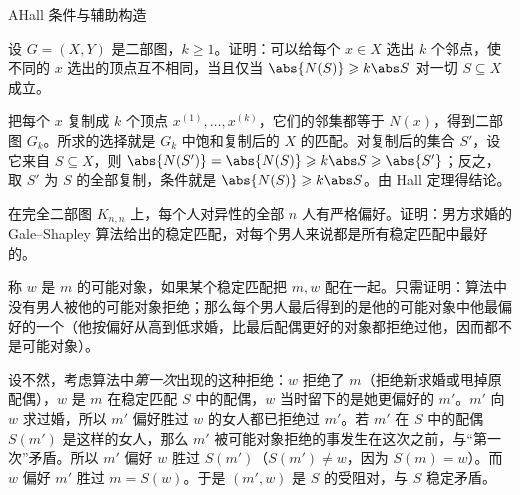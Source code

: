 \begin{exercises}{A}{Hall 条件与辅助构造}
\item\label{ex:hall-condition:A4} 设 $G=(X,Y)$ 是二部图，$k\geqslant1$。证明：可以给每个 $x\in X$ 选出 $k$ 个邻点，使不同的 $x$ 选出的顶点互不相同，当且仅当 $\abs{N(S)}\geqslant k\abs S$ 对一切 $S\subseteq X$ 成立。
\begin{solution}
把每个 $x$ 复制成 $k$ 个顶点 $x^{(1)},\dots,x^{(k)}$，它们的邻集都等于 $N(x)$，得到二部图 $G_k$。所求的选择就是 $G_k$ 中饱和复制后的 $X$ 的匹配。对复制后的集合 $S'$，设它来自 $S\subseteq X$，则 $\abs{N(S')}=\abs{N(S)}\geqslant k\abs S\geqslant\abs{S'}$；反之，取 $S'$ 为 $S$ 的全部复制，条件就是 $\abs{N(S)}\geqslant k\abs S$。由 Hall 定理得结论。
\end{solution}

\item\label{ex:hall-condition:A5} 在完全二部图 $K_{n,n}$ 上，每个人对异性的全部 $n$ 人有严格偏好。证明：男方求婚的 Gale--Shapley 算法给出的稳定匹配，对每个男人来说都是所有稳定匹配中最好的。
\begin{solution}
称 $w$ 是 $m$ 的可能对象，如果某个稳定匹配把 $m,w$ 配在一起。只需证明：算法中没有男人被他的可能对象拒绝；那么每个男人最后得到的是他的可能对象中他最偏好的一个（他按偏好从高到低求婚，比最后配偶更好的对象都拒绝过他，因而都不是可能对象）。

设不然，考虑算法中\emph{第一次}出现的这种拒绝：$w$ 拒绝了 $m$（拒绝新求婚或甩掉原配偶），$w$ 是 $m$ 在稳定匹配 $S$ 中的配偶，$w$ 当时留下的是她更偏好的 $m'$。$m'$ 向 $w$ 求过婚，所以 $m'$ 偏好胜过 $w$ 的女人都已拒绝过 $m'$。若 $m'$ 在 $S$ 中的配偶 $S(m')$ 是这样的女人，那么 $m'$ 被可能对象拒绝的事发生在这次之前，与“第一次”矛盾。所以 $m'$ 偏好 $w$ 胜过 $S(m')$（$S(m')\neq w$，因为 $S(m)=w$）。而 $w$ 偏好 $m'$ 胜过 $m=S(w)$。于是 $(m',w)$ 是 $S$ 的受阻对，与 $S$ 稳定矛盾。
\end{solution}
\end{exercises}
